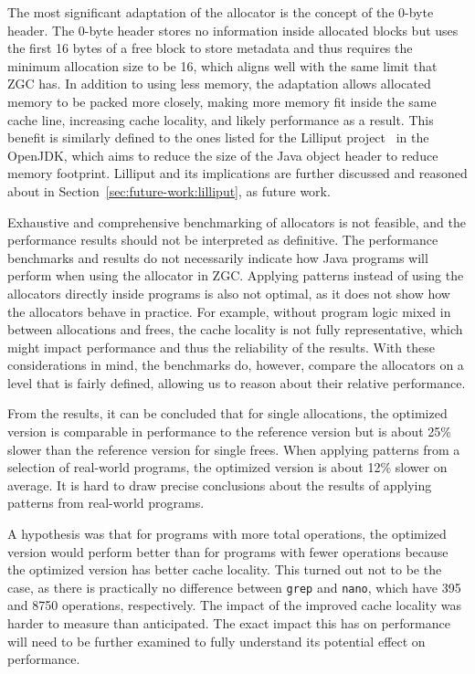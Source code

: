 
The most significant adaptation of the allocator is the concept of the 0-byte header. The 0-byte header stores no information inside allocated blocks but uses the first 16 bytes of a free block to store metadata and thus requires the minimum allocation size to be 16, which aligns well with the same limit that ZGC has. In addition to using less memory, the adaptation allows allocated memory to be packed more closely, making more memory fit inside the same cache line, increasing cache locality, and likely performance as a result. This benefit is similarly defined to the ones listed for the Lilliput project~\cite{lilliput} in the OpenJDK, which aims to reduce the size of the Java object header to reduce memory footprint. Lilliput and its implications are further discussed and reasoned about in Section~\ref{sec:future-work:lilliput}, as future work.

Exhaustive and comprehensive benchmarking of allocators is not feasible, and the performance results should not be interpreted as definitive. The performance benchmarks and results do not necessarily indicate how Java programs will perform when using the allocator in ZGC. Applying patterns instead of using the allocators directly inside programs is also not optimal, as it does not show how the allocators behave in practice. For example, without program logic mixed in between allocations and frees, the cache locality is not fully representative, which might impact performance and thus the reliability of the results. With these considerations in mind, the benchmarks do, however, compare the allocators on a level that is fairly defined, allowing us to reason about their relative performance. 

From the results, it can be concluded that for single allocations, the optimized version is comparable in performance to the reference version but is about 25\% slower than the reference version for single frees. When applying patterns from a selection of real-world programs, the optimized version is about 12\% slower on average. It is hard to draw precise conclusions about the results of applying patterns from real-world programs. 

A hypothesis was that for programs with more total operations, the optimized version would perform better than for programs with fewer operations because the optimized version has better cache locality. This turned out not to be the case, as there is practically no difference between \texttt{grep} and \texttt{nano}, which have 395 and 8750 operations, respectively. The impact of the improved cache locality was harder to measure than anticipated. The exact impact this has on performance will need to be further examined to fully understand its potential effect on performance.

